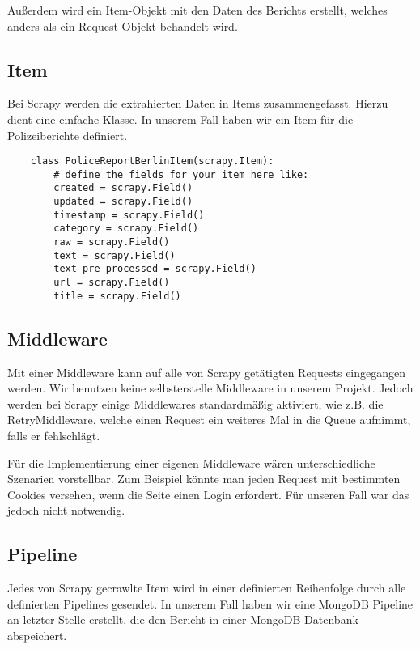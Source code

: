 Außerdem wird ein Item-Objekt mit den Daten des Berichts erstellt, welches anders als ein Request-Objekt behandelt wird.

\subsection{Item}

Bei Scrapy werden die extrahierten Daten in Items zusammengefasst. Hierzu dient eine einfache Klasse.
In unserem Fall haben wir ein Item für die Polizeiberichte definiert.

\begin{verbatim}
    class PoliceReportBerlinItem(scrapy.Item):
        # define the fields for your item here like:
        created = scrapy.Field()
        updated = scrapy.Field()
        timestamp = scrapy.Field()
        category = scrapy.Field()
        raw = scrapy.Field()
        text = scrapy.Field()
        text_pre_processed = scrapy.Field()
        url = scrapy.Field()
        title = scrapy.Field()
    \end{verbatim}

\subsection{Middleware}

Mit einer Middleware kann auf alle von Scrapy getätigten Requests eingegangen werden. Wir benutzen keine selbsterstelle
Middleware in unserem Projekt. Jedoch werden bei Scrapy einige Middlewares standardmäßig aktiviert, wie z.B.
die RetryMiddleware, welche einen Request ein weiteres Mal in die Queue aufnimmt, falls er fehlschlägt.

Für die Implementierung einer eigenen Middleware wären unterschiedliche Szenarien vorstellbar. Zum Beispiel könnte man
jeden Request mit bestimmten Cookies versehen, wenn die Seite einen Login erfordert. Für unseren Fall war das jedoch nicht
notwendig.

\subsection{Pipeline}

Jedes von Scrapy gecrawlte Item wird in einer definierten Reihenfolge durch alle definierten Pipelines gesendet.
In unserem Fall haben wir eine MongoDB Pipeline an letzter Stelle erstellt, die den Bericht in einer MongoDB-Datenbank abspeichert.
